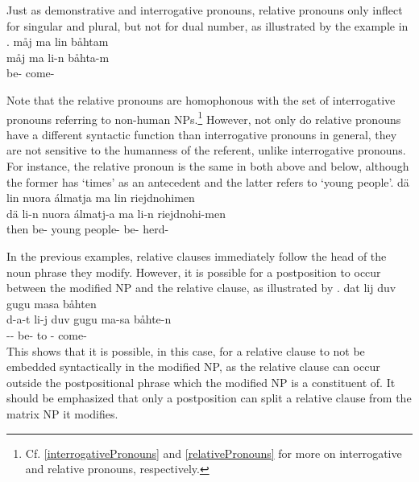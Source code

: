 Just as demonstrative and interrogative pronouns, relative pronouns only inflect for singular and plural, but not for dual number, as illustrated by the example in . 
\ea\label{relClause4}%
\glll	måj ma lin båhtam\\
	måj ma li-n båhta-m\\
	 \BS{} be- come-\\\nopagebreak
{} 
\z

Note that the relative pronouns are homophonous with the %
set of interrogative pronouns referring to non-human NPs.\footnote{Cf. \SEC\ref{interrogativePronouns} and \SEC\ref{relativePronouns} for more on interrogative and relative pronouns, respectively.} 
However, not only do relative pronouns have a different syntactic function than interrogative pronouns in general, they are not sensitive to the humanness of the referent, unlike interrogative pronouns. For instance, the relative pronoun  is the same in both  above and  below, although the former has ‘times’ as an antecedent and the latter refers to ‘young people’.
\ea\label{relClause5}%
\glll	dä lin nuora álmatja ma lin riejdnohimen\\
	dä li-n nuora álmatj-a ma li-n riejdnohi-men\\
	then be- young\BS{} people- \BS{} be- herd-\\\nopagebreak
{} 
\z

In the previous examples, relative clauses immediately follow the head of the noun phrase they modify. However, it is possible for a postposition to occur between the modified NP and the relative clause, as illustrated by . 
\ea\label{relClause6}%
\glll	dat lij duv gugu masa båhten\\
	d-a-t li-j duv gugu ma-sa båhte-n\\
	-- be-  to - come-\\\nopagebreak
{} 
\z
This shows that it is possible, in this case, for a relative clause to not be embedded syntactically in the modified NP, as the relative clause can occur outside the postpositional phrase which the modified NP is a constituent of. It should be emphasized that only a postposition can split a relative clause from the matrix NP it modifies.


